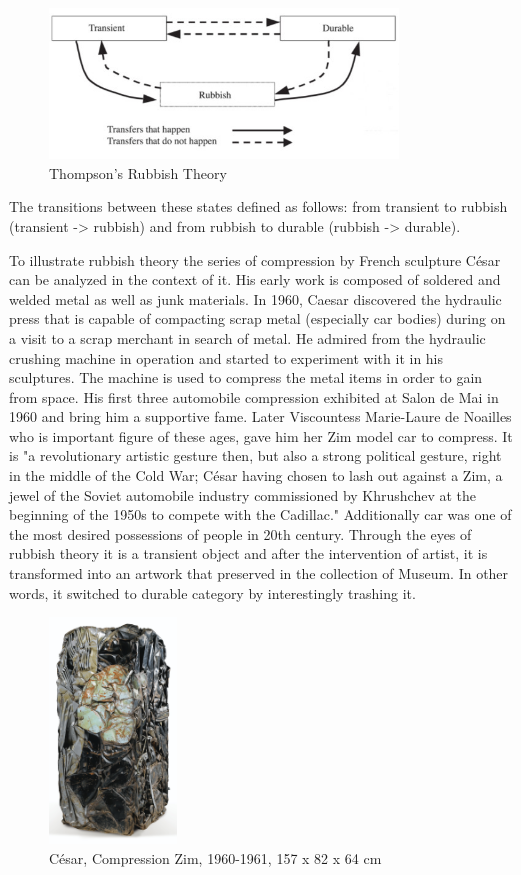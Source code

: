 \begin{figure}[h!]
  \centering
  \includegraphics[height=4cm]{graphics/rubbish_theory.jpg}
  \caption{Thompson’s Rubbish Theory}
  \label{fig:rubish_theory}
\end{figure}

The transitions between these states defined as follows: from transient to rubbish (transient -> rubbish) and from rubbish to durable (rubbish -> durable). 

To illustrate rubbish theory the series of compression by French sculpture César can be analyzed in the context of it. His early work is composed of soldered and welded metal as well as junk materials. In 1960, Caesar discovered the hydraulic press that is capable of compacting scrap metal (especially car bodies) during on a visit to a scrap merchant in search of metal. He admired from the hydraulic crushing machine in operation and started to experiment with it in his sculptures. The machine is used to compress the metal items in order to gain from space. His first three automobile compression exhibited at Salon de Mai in 1960 and bring him a supportive fame. Later Viscountess Marie-Laure de Noailles who is important figure of these ages, gave him her Zim model car to compress. It is 
"a revolutionary artistic gesture then, but also a strong political gesture, right in the middle of the Cold War; César having chosen to lash out against a Zim, a jewel of the Soviet automobile industry commissioned by Khrushchev at the beginning of the 1950s to compete with the Cadillac." Additionally car was one of the most desired possessions of people in 20th century. Through the eyes of rubbish theory it is a transient object and after the intervention of artist, it is transformed into an artwork that preserved in the collection of Museum. In other words, it switched to durable category by interestingly trashing it. 

\begin{figure}[h!]
  \centering
  \includegraphics[height=6cm]{graphics/Cesar_Zim.jpg}
  \caption{César, Compression Zim, 1960-1961, 157 x 82 x 64 cm}
  \label{fig:Cesar_Zim}
\end{figure}

